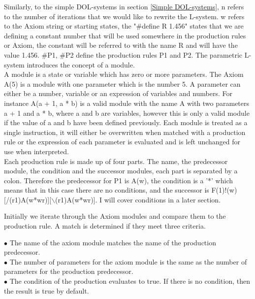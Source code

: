 \begin{flushleft}
Similarly, to the simple DOL-systems in section \ref{Simple DOL-systems}, n refers to the number of iterations that we would like to rewrite the L-system. w refers to the Axiom string or starting states, the "\#define R 1.456" states that we are defining a constant number that will be used somewhere in the production rules or Axiom, the constant will be referred to with the name R and will have the value 1.456. \#P1, \#P2 define the production rules P1 and P2. The parametric L-system introduces the concept of a module.\\
A module is a state or variable which has zero or more parameters. The Axiom A(5) is a module with one parameter which is the number 5. A parameter can either be a number, variable or an expression of variables and numbers. For instance A(a + 1, a * b) is a valid module with the name A with two parameters a + 1 and a * b, where a and b are variables, however this is only a valid module if the value of a and b have been defined previously. Each module is treated as a single instruction, it will either be overwritten when matched with a production rule or the expression of each parameter is evaluated and is left unchanged for use when interpreted.\\
Each production rule is made up of four parts. The name, the predecessor module, the condition and the successor modules, each part is separated by a colon. Therefore the predecessor for P1 is A(w), the condition is a '*' which means that in this case there are no conditions, and the successor is F(1)!(w)[/(r1)A(w*wr)][$\backslash$(r1)A(w*wr)]. I will cover conditions in a later section.\\

\vspace{5mm}

Initially we iterate through the Axiom modules and compare them to the production rule. A match is determined if they meet three criteria.\\

\vspace{5mm}

$\bullet$ The name of the axiom module matches the name of the production predecessor. \\
$\bullet$ The number of parameters for the axiom module is the same as the number of parameters for the production predecessor. \\
$\bullet$ The condition of the production evaluates to true. If there is no condition, then the result is true by default.\\

\end{flushleft}

